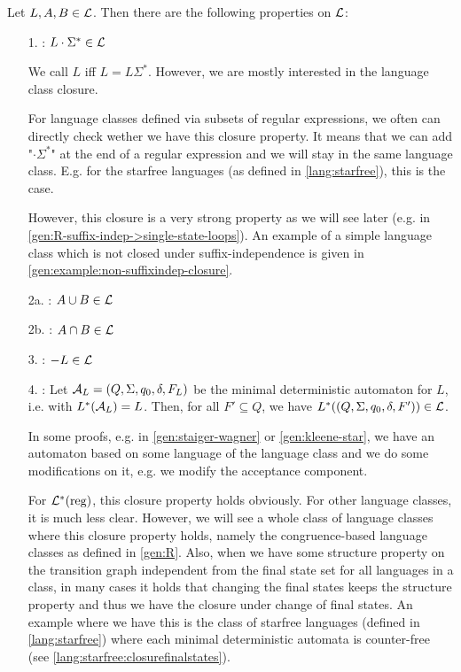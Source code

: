 Let $L,A,B \in \mathcal{L}$. Then there are the following properties on $\mathcal{L}$:
\begin{enumerate}
\item[1.] : $L \cdot \Sigma^* \in \mathcal{L}$

We call $L$  iff $L = L \Sigma^*$. However, we are mostly interested in the language class closure.

For language classes defined via subsets of regular expressions, we often can directly check wether we have this closure property. It means that we can add "$\cdot\Sigma^*$" at the end of a regular expression and we will stay in the same language class. E.g. for the starfree languages (as defined in \cref{lang:starfree}), this is the case.

However, this closure is a very strong property as we will see later (e.g. in \cref{gen:R-suffix-indep->single-state-loops}). An example of a simple language class which is not closed under suffix-independence is given in \cref{gen:example:non-suffixindep-closure}.

\item[2a.] : $A \cup B \in \mathcal{L}$
\item[2b.] : $A \cap B \in \mathcal{L}$
\item[3.] : $- L \in \mathcal{L}$

\item[4.]
:
Let $\mathcal{A}_L = (Q,\Sigma,q_0,\delta,F_L)$ be the minimal deterministic automaton for $L$, i.e. with $L^*(\mathcal{A}_L) = L$. Then, for all $F' \subseteq Q$, we have $L^*((Q,\Sigma,q_0,\delta,F')) \in \mathcal{L}$.

In some proofs, e.g. in \cref{gen:staiger-wagner} or \cref{gen:kleene-star}, we have an automaton based on some language of the language class and we do some modifications on it, e.g. we modify the acceptance component.

For $\mathcal{L}^*(\textup{\textrm{reg}})$, this closure property holds obviously. For other language classes, it is much less clear. However, we will see a whole class of language classes where this closure property holds, namely the congruence-based language classes as defined in \cref{gen:R}. Also, when we have some structure property on the transition graph independent from the final state set for all languages in a class, in many cases it holds that changing the final states keeps the structure property and thus we have the closure under change of final states. An example where we have this is the class of starfree languages (defined in \cref{lang:starfree}) where each minimal deterministic automata is counter-free (see \cref{lang:starfree:closurefinalstates}).


\end{enumerate}
